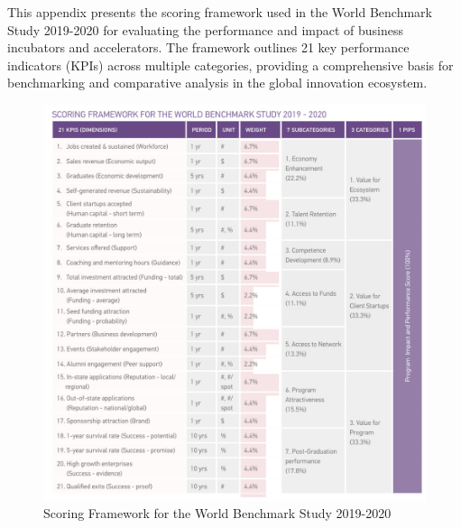 \documentclass[../Main.tex]{subfiles}
\begin{document}
This appendix presents the scoring framework used in the World Benchmark Study 2019-2020 for evaluating the performance and impact of business incubators and accelerators. The framework outlines 21 key performance indicators (KPIs) across multiple categories, providing a comprehensive basis for benchmarking and comparative analysis in the global innovation ecosystem.


\begin{figure}[H]
    \centering
    \includegraphics[width=\textwidth]{../../Figure/scoring_frame.png}
    \caption{Scoring Framework for the World Benchmark Study 2019-2020}
    \label{fig:scoring_framework}
\end{figure}
\end{document}
